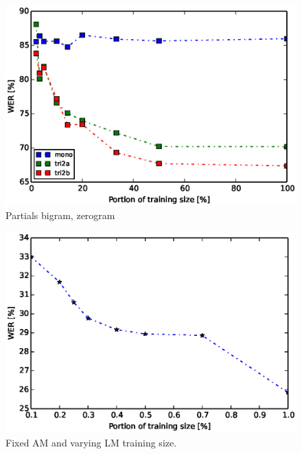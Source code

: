 \begin{figure}[!htp]
    \begin{center}
    \includegraphics{images/partial-zerogram.ps}
    \caption{Partials bigram, zerogram}
    \label{fig:partials} 
    \end{center}
\end{figure}

\begin{figure}[!htp]
    \begin{center}
    \includegraphics{images/partial-lm-tri2b-bmmi.ps}
    \caption{Fixed  \ac{AM} and varying \ac{LM} training size.}
    \label{fig:partials_lm} 
    \end{center}
\end{figure}


